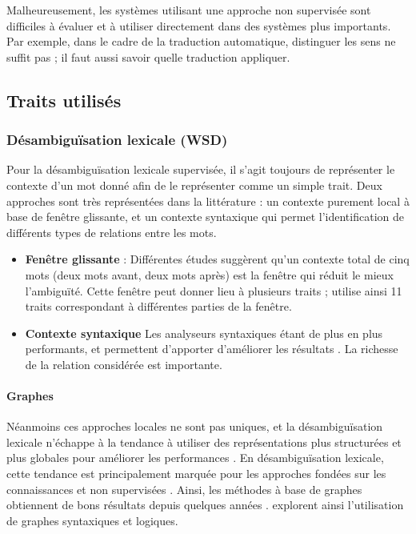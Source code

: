 Malheureusement, les systèmes utilisant une approche non supervisée sont
difficiles à évaluer et à utiliser directement dans des systèmes plus
importants. Par exemple, dans le cadre de la traduction automatique, distinguer
les sens ne suffit pas ; il faut aussi savoir quelle traduction appliquer.

\subsection{Traits utilisés}

\subsubsection{Désambiguïsation lexicale (WSD)}

Pour la désambiguïsation lexicale supervisée, il s'agit toujours de représenter
le contexte d'un mot donné afin de le représenter comme un simple trait. Deux
approches sont très représentées dans la littérature : un contexte purement
local à base de fenêtre glissante, et un contexte syntaxique qui permet
l'identification de différents types de relations entre les mots.

\begin{itemize}

    \item \textbf{Fenêtre glissante} : Différentes études
        \citep{kaplan1955experimental,choueka1985disambiguation,karlgren2001from,kohomban2005learning,dinu2007sometimes}
        suggèrent qu'un contexte total de cinq mots (deux mots avant, deux mots
        après) est la fenêtre qui réduit le mieux l'ambiguïté. Cette fenêtre
        peut donner lieu à plusieurs traits ; \cite{chan2007nus} utilise ainsi
        11 traits correspondant à différentes parties de la fenêtre.

    \item \textbf{Contexte syntaxique} Les analyseurs syntaxiques étant de plus
        en plus performants, et permettent d'apporter d'améliorer les résultats
        \citep{martinez2002syntactic}. La richesse de la relation considérée
        est importante.

\end{itemize}

\paragraph{Graphes}

Néanmoins ces approches locales ne sont pas uniques, et la désambiguïsation
lexicale n'échappe à la tendance à utiliser des représentations plus
structurées et plus globales pour améliorer les performances
\citep{marquez2012special}. En désambiguïsation lexicale, cette tendance est
principalement marquée pour les approches fondées sur les connaissances et non
supervisées \citep[p~.14]{navigli2009word}. Ainsi, les méthodes à base de
graphes \cite{navigli2005semantic,agirre2009personalizing} obtiennent de bons
résultats depuis quelques années
\citep{navigli2007semeval,ponzetto2010knowledge}. %
explorent ainsi l'utilisation de graphes syntaxiques et logiques.

